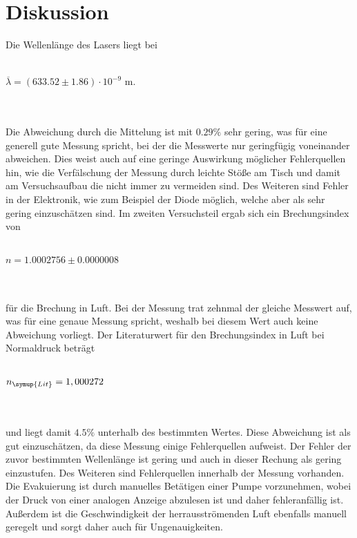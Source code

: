 \section{Diskussion}
\label{sec:Diskussion}
Die Wellenlänge des Lasers liegt bei 
\\ \\
    \centerline{$\overline{\lambda} = (633.52 \pm 1.86) \cdot 10^{-9} $ m.}
\\ \\
Die Abweichung durch die Mittelung ist mit $0.29 \%$ sehr gering, was für eine generell gute Messung spricht, bei der die Messwerte 
nur geringfügig voneinander abweichen. Dies weist auch auf eine geringe Auswirkung möglicher Fehlerquellen hin, wie die Verfälschung der 
Messung durch leichte Stöße am Tisch und damit am Versuchsaufbau die nicht immer zu vermeiden sind. Des Weiteren sind Fehler in der Elektronik, 
wie zum Beispiel der Diode möglich, welche aber als sehr gering einzuschätzen sind.
Im zweiten Versuchsteil ergab sich ein Brechungsindex von 
 \\ \\
    \centerline{$n = 1.0002756 \pm 0.0000008$}
\\ \\
für die Brechung in Luft. Bei der Messung trat zehnmal der gleiche Messwert auf, was für eine genaue Messung spricht, weshalb bei 
diesem Wert auch keine Abweichung vorliegt. 
Der Literaturwert für den Brechungsindex in Luft bei Normaldruck beträgt 
\\ \\
    \centerline{$n_{\symup{Lit}} = 1,000272 $ \cite{spektrum}}
\\ \\
und liegt damit $4.5 \%$ unterhalb des bestimmten Wertes. Diese Abweichung ist als gut einzuschätzen, da diese Messung einige Fehlerquellen 
aufweist. Der Fehler der zuvor bestimmten Wellenlänge ist gering und auch in dieser Rechung als gering einzustufen. Des Weiteren sind 
Fehlerquellen innerhalb der Messung vorhanden. Die Evakuierung ist durch manuelles Betätigen einer Pumpe vorzunehmen, wobei der Druck
von einer analogen Anzeige abzulesen ist und daher fehleranfällig ist. Außerdem ist die Geschwindigkeit der herrausströmenden Luft 
ebenfalls manuell geregelt und sorgt daher auch für Ungenauigkeiten.
